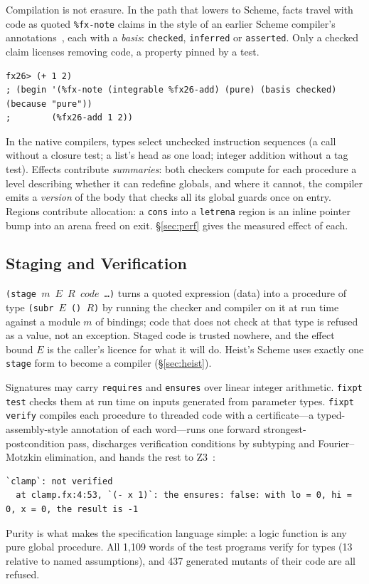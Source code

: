 \documentclass[acmsmall,screen,review]{acmart}
\newcommand{\cd}[1]{\texttt{#1}}
\begin{document}
Compilation is not erasure. In the path that lowers to Scheme, facts
travel with code as quoted \cd{\%fx-note} claims in the style of
an earlier Scheme compiler's annotations~\cite{twobit}, each with a \emph{basis}:
\cd{checked}, \cd{inferred} or \cd{asserted}. Only a checked claim
licenses removing code, a property pinned by a test.
\begin{lstlisting}[style=out]
fx26> (+ 1 2)
; (begin '(%fx-note (integrable %fx26-add) (pure) (basis checked) (because "pure"))
;        (%fx26-add 1 2))
\end{lstlisting}
In the native compilers, types select unchecked instruction sequences
(a call without a closure test; a list's head as one load; integer addition
without a tag test). Effects contribute \emph{summaries}: both checkers
compute for each procedure a level describing whether it can redefine
globals, and where it cannot, the compiler emits a \emph{version} of
the body that checks all its global guards once on entry. Regions
contribute allocation: a \cd{cons} into a \cd{letrena} region is an
inline pointer bump into an arena freed on exit.
\S\ref{sec:perf} gives the measured effect of each.

\subsection{Staging and Verification}

\cd{(stage $m$ $E$ $R$ $\mathit{code}$ \ldots)} turns a quoted expression (data) into a
procedure of type \cd{(subr $E$ () $R$)} by running the checker and
compiler on it at run time against a module $m$ of bindings; code that
does not check at that type is refused as a value, not an exception.
Staged code is trusted nowhere, and the effect bound $E$ is the
caller's licence for what it will do. Heist's Scheme uses exactly one
\cd{stage} form to become a compiler (\S\ref{sec:heist}).

Signatures may carry \cd{requires} and \cd{ensures} over linear integer
arithmetic. \cd{fixpt test} checks them at run time on inputs generated
from parameter types. \cd{fixpt verify} compiles each procedure to
threaded code with a certificate---a typed-assembly-style annotation of
each word---runs one forward strongest-postcondition pass, discharges
verification conditions by subtyping and Fourier--Motzkin elimination,
and hands the rest to Z3~\cite{z3}:
\begin{lstlisting}[style=out]
`clamp`: not verified
  at clamp.fx:4:53, `(- x 1)`: the ensures: false: with lo = 0, hi = 0, x = 0, the result is -1
\end{lstlisting}
Purity is what makes the specification language simple: a logic
function is any pure global procedure. All 1,109 words of the test
programs verify for types (13 relative to named assumptions), and 437
generated mutants of their code are all refused.
\end{document}
